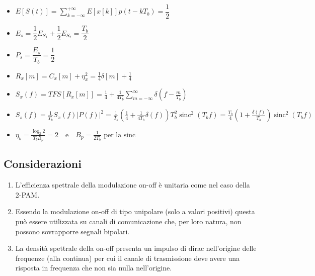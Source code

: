 \begin{itemize}
    \item $
E[S(t)] = \sum_{k=-\infty}^{+\infty} E[x[k]] p(t-kT_b) = \dfrac{1}{2}$
\item $
E_s = \dfrac{1}{2}E_{S_1} + \dfrac{1}{2}E_{S_2} = \dfrac{T_b}{2}
$
\item 
$
P_s = \dfrac{E_s}{T_b} = \dfrac{1}{2}$
\item $R_x[m] = C_x[m] + {\eta}_x^2 = \frac{1}{4} {\delta}[m] + \frac{1}{4}$

\item $S_x(f) = TFS\left[ R_x[m] \right] = \frac{1}{4} + \frac{1}{4T_b} \sum_{m=-\infty}^{\infty} \delta\left(f - \frac{m}{T_b}\right)$
\item $S_s(f) = \frac{1}{T_b} S_x(f)|P(f)|^2 = \frac{1}{T_b} \left( \frac{1}{4} + \frac{1}{4T_b} \delta(f) \right) T_b^2 \operatorname{sinc}^2(T_b f) = \frac{T_b}{4} \left( 1 + \frac{\delta(f)}{T_b} \right)\operatorname{sinc}^2(T_b f)$

\item ${\eta}_b = \frac{\log_2{2}}{T_b B_p} = 2 \quad \text{e} \quad B_p = \frac{1}{2T_b} \text{ per la sinc}$
\end{itemize}



\subsection*{Considerazioni}
\begin{enumerate}
  \item L'efficienza spettrale della modulazione on-off è unitaria come nel caso della 2-PAM.
  \item Essendo la modulazione on-off di tipo unipolare (solo a valori positivi) questa può essere utilizzata su canali di comunicazione che, per loro natura, non possono sovrapporre segnali bipolari.
  \item La densità spettrale della on-off presenta un impulso di dirac nell'origine delle frequenze (alla continua) per cui il canale di trasmissione deve avere una risposta in frequenza che non sia nulla nell'origine.
\end{enumerate}
